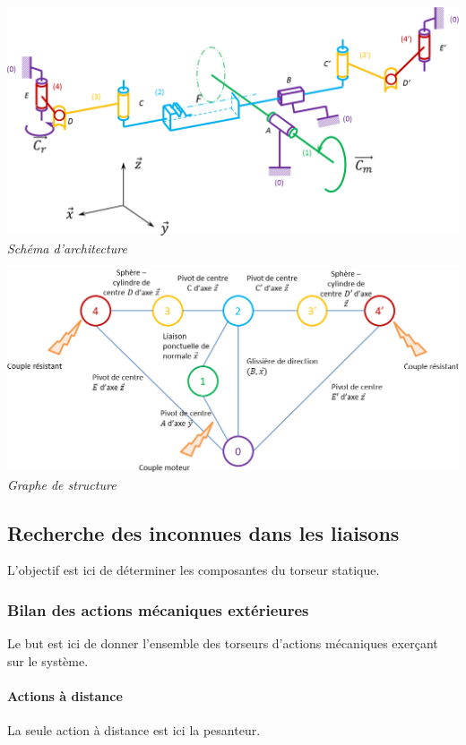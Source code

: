 \documentclass[10pt]{article}
\begin{document}
\begin{center}
\includegraphics[width=\textwidth]{images/schema}
\textit{Schéma d'architecture}
\end{center}

\begin{center}
\includegraphics[width=\textwidth]{images/graphe}
\textit{Graphe de structure}
\end{center}

\subsection{Recherche des inconnues dans les liaisons}
\begin{obj}
L'objectif est ici de déterminer les composantes du torseur statique.
\end{obj}
\subsubsection{Bilan des actions mécaniques extérieures}
\begin{rem}
Le but est ici de donner l'ensemble des torseurs d'actions mécaniques exerçant sur le système. 
\end{rem}

\paragraph*{Actions à distance}
La seule action à distance est ici la pesanteur. 
\end{document}
